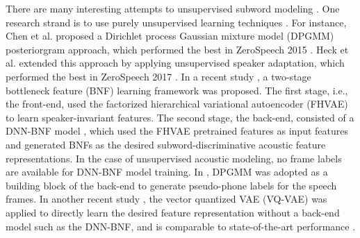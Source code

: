 \documentclass[a4paper]{article}
\begin{document}
There are many interesting attempts  to unsupervised subword modeling \cite{chen2015parallel,heck2017feature,chorowski2019unsupervised,shibata2017composite,feng2019_TASLP,riviere2020unsupervised,Feng2019combining}. One research strand is to use purely unsupervised learning techniques 
\cite{chen2015parallel,heck2017feature,chorowski2019unsupervised}. For instance, Chen et al. \cite{chen2015parallel} proposed a Dirichlet process Gaussian mixture model (DPGMM) posteriorgram approach, which performed the best in ZeroSpeech 2015 \cite{versteegh2015zero}.  Heck et al. extended this approach by applying unsupervised speaker adaptation, which performed the best in ZeroSpeech 2017 \cite{heck2017feature}. 
In a recent study \cite{Feng2019improving}, a two-stage bottleneck feature (BNF) learning framework was proposed.
The first stage, i.e., the front-end, used the factorized hierarchical variational autoencoder (FHVAE) \cite{hsu2017nips} to learn speaker-invariant features. The second stage, the back-end, consisted of a DNN-BNF model \cite{chen2017multilingual}, which used the FHVAE pretrained features as input features and generated BNFs as the desired subword-discriminative acoustic feature representations. In the case of unsupervised acoustic modeling, no frame labels are available for DNN-BNF model training.
In \cite{Feng2019improving},
 DPGMM was adopted  
 as a building block of the back-end
 to generate pseudo-phone labels for the speech frames.
In another recent study  \cite{chorowski2019unsupervised}, the vector quantized VAE (VQ-VAE) \cite{oord2017neural} was applied to directly learn the desired feature representation without a back-end model such as the DNN-BNF, and is comparable to state-of-the-art performance \cite{heck2017feature}. 
\end{document}
